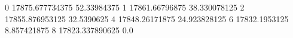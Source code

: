 0 17875.677734375 52.33984375
1 17861.66796875 38.330078125
2 17855.876953125 32.5390625
4 17848.26171875 24.923828125
6 17832.1953125 8.857421875
8 17823.337890625 0.0
